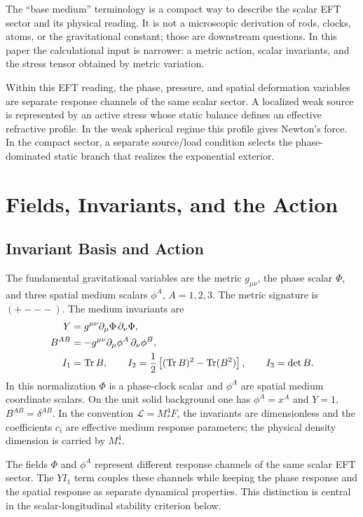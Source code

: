 \documentclass[12pt,a4paper]{article}
\begin{document}
The ``base medium'' terminology is a compact way to describe the scalar EFT
sector and its physical reading. It is not a microscopic derivation of rods,
clocks, atoms, or the gravitational constant; those are downstream questions. In this paper the calculational input is narrower: a
metric action, scalar invariants, and the stress tensor obtained by metric
variation.

Within this EFT reading, the phase, pressure, and spatial deformation variables
are separate response channels of the same scalar sector. A localized weak
source is represented by an active stress whose static balance defines an
effective refractive profile. In the weak spherical regime this profile gives
Newton's force. In the compact sector, a separate source/load condition selects
the phase-dominated static branch that realizes the exponential exterior.

\section{Fields, Invariants, and the Action}

\subsection{Invariant Basis and Action}

The fundamental gravitational variables are the metric $g_{\mu\nu}$, the phase scalar $\Phi$, and three spatial medium scalars $\phi^A$, $A=1,2,3$. The metric signature is $(+---)$. The medium invariants are
\begin{align*}
Y &= g^{\mu\nu}\partial_\mu\Phi\,\partial_\nu\Phi,\\
B^{AB} &= -g^{\mu\nu}\partial_\mu\phi^A\,\partial_\nu\phi^B,\\
I_1 &= {\rm Tr}\,B,\qquad
I_2=\frac{1}{2}\left[({\rm Tr}\,B)^2-{\rm Tr}(B^2)\right],\qquad
I_3=\det B.
\end{align*}
In this normalization $\Phi$ is a phase-clock scalar and $\phi^A$ are spatial medium coordinate scalars. On the unit solid background one has $\phi^A=x^A$ and $Y=1$, $B^{AB}=\delta^{AB}$. In the convention $\mathcal L=M_*^4F$, the invariants are dimensionless and the coefficients $c_i$ are effective medium response parameters; the physical density dimension is carried by $M_*^4$.

The fields $\Phi$ and $\phi^A$ represent different response channels of the
same scalar EFT sector. The $YI_1$ term couples these channels while keeping the
phase response and the spatial response as separate dynamical properties. This
distinction is central in the scalar-longitudinal stability criterion below.
\end{document}
